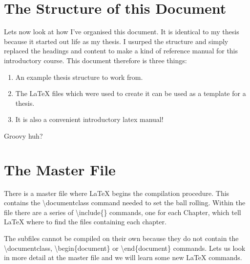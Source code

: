\pagebreak
\section{The Structure of this Document}

Lets now look at how I've organised this document. It is identical to my thesis because it started out life as my thesis. I usurped the structure and simply replaced the headings and content to make a kind of reference manual for this introductory course. This document therefore is three things:

\begin{enumerate}
\item An example thesis structure to work from.
\item The LaTeX files which were used to create it can be used as a template for a thesis.
\item It is also a convenient introductory latex manual!
\end{enumerate}

\vspace*{2ex}
Groovy huh?

\section{The Master File}

There is a master file where LaTeX begins the compilation procedure. This contains the {\textbackslash}documentclass command needed to set the ball rolling. Within the file there are a series of {\textbackslash}include\{\} commands, one for each Chapter, which tell LaTeX where to find the files containing each chapter.

The subfiles cannot be compiled on their own because they do not contain the {\textbackslash}documentclass, {\textbackslash}begin\{document\} or {\textbackslash}end\{document\} commands. Lets us look in more detail at the master file and we will learn some new LaTeX commands.

